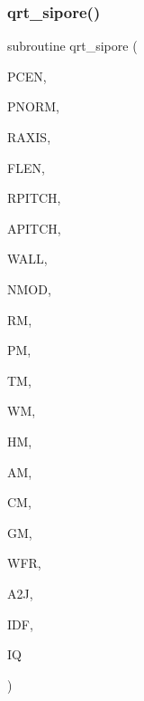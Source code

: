 \subsubsection{\texorpdfstring{qrt\+\_\+sipore()}{qrt\_sipore()}}
{\footnotesize\ttfamily subroutine qrt\+\_\+sipore (\begin{DoxyParamCaption}\item[{double precision, dimension(3)}]{P\+C\+EN,  }\item[{double precision, dimension(3)}]{P\+N\+O\+RM,  }\item[{double precision, dimension(3)}]{R\+A\+X\+IS,  }\item[{double precision}]{F\+L\+EN,  }\item[{double precision}]{R\+P\+I\+T\+CH,  }\item[{double precision}]{A\+P\+I\+T\+CH,  }\item[{double precision}]{W\+A\+LL,  }\item[{integer}]{N\+M\+OD,  }\item[{double precision, dimension(nmod)}]{RM,  }\item[{double precision, dimension(nmod)}]{PM,  }\item[{double precision, dimension(nmod)}]{TM,  }\item[{double precision, dimension(nmod)}]{WM,  }\item[{double precision, dimension(nmod)}]{HM,  }\item[{double precision, dimension(nmod)}]{AM,  }\item[{double precision, dimension(nmod)}]{CM,  }\item[{double precision, dimension(nmod)}]{GM,  }\item[{double precision}]{W\+FR,  }\item[{double precision}]{A2J,  }\item[{integer}]{I\+DF,  }\item[{integer}]{IQ }\end{DoxyParamCaption})}

